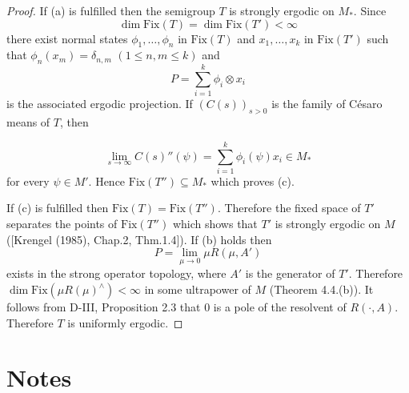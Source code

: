 \begin{proof}
If (a) is fulfilled then the semigroup \(T\) is strongly ergodic on \(M_{*}\).
Since
\[
\dim \text{Fix}(T) = \dim \text{Fix}(T') < \infty
\]
there exist normal states \(\phi_{1},\ldots,\phi_{n}\) in \(\text{Fix}(T)\) and \(x_{1},\ldots,x_{k}\) in \(\text{Fix}(T')\) such that \(\phi_{n}(x_{m}) = \delta_{n,m}\) \((1 \leq n,m \leq k)\) and
\[
P = \sum_{i=1}^{k} \phi_{i} \otimes x_{i}
\]
is the associated ergodic projection.
If \((C(s))_{s>0}\) is the family of Césaro means of \(T\), then

\newpage

\[
\lim_{s \to \infty} C(s)''(\psi) = \sum_{i=1}^{k} \phi_{i}(\psi)x_{i} \in M_{*}
\]
for every \(\psi \in M'\).
Hence \(\text{Fix}(T'') \subseteq M_{*}\) which proves (c).

If (c) is fulfilled then \(\text{Fix}(T) = \text{Fix}(T'')\).
Therefore the fixed space of \(T'\) separates the points of \(\text{Fix}(T'')\) which shows that \(T'\) is strongly ergodic on \(M\) ([Krengel (1985), Chap.2, Thm.1.4]).
If (b) holds then
\[
P = \lim_{\mu \to 0} \mu R(\mu,A')
\]
exists in the strong operator topology, where \(A'\) is the generator of \(T'\).
Therefore \(\dim \text{Fix}(\mu R(\mu)^{\wedge}) < \infty\) in some ultrapower of \(M\) (Theorem 4.4.(b)).
It follows from D-III, Proposition 2.3 that 0 is a pole of the resolvent of \(R(\cdot,A)\).
Therefore \(T\) is uniformly ergodic.
\end{proof}

\section*{Notes}\label{notes:d4-notes}


